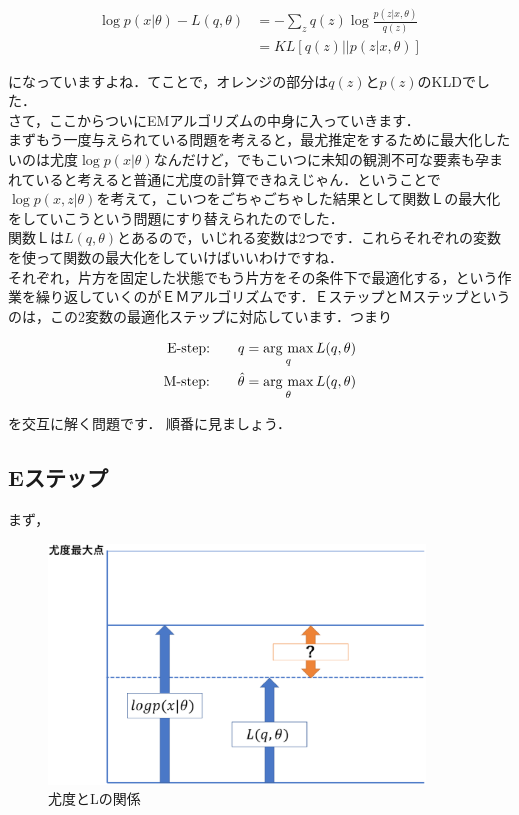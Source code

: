 \documentclass[11pt,a4paper]{ujreport}
\newcommand{\argmax}{\mathop{\rm arg~max}\limits}
\begin{document}
\begin{align}
  \log p(x|\theta) - L(q,\theta)&= -\sum_z q(z) \log \frac{p(z|x,\theta)}{q(z)}\nonumber\\
  &= KL[q(z)||p(z|x,\theta)]\nonumber
\end{align}

になっていますよね．てことで，オレンジの部分は$q(z)$と$p(z)$のKLDでした．\\

さて，ここからついにEMアルゴリズムの中身に入っていきます．\\

まずもう一度与えられている問題を考えると，最尤推定をするために最大化したいのは尤度$\log p(x|\theta)$なんだけど，でもこいつに未知の観測不可な要素も孕まれていると考えると普通に尤度の計算できねえじゃん．ということで$\log p(x,z|\theta)$を考えて，こいつをごちゃごちゃした結果として関数Ｌの最大化をしていこうという問題にすり替えられたのでした．\\

関数Ｌは$L(q,\theta)$とあるので，いじれる変数は2つです．これらそれぞれの変数を使って関数の最大化をしていけばいいわけですね．\\

それぞれ，片方を固定した状態でもう片方をその条件下で最適化する，という作業を繰り返していくのがＥＭアルゴリズムです．ＥステップとＭステップというのは，この2変数の最適化ステップに対応しています．つまり

\begin{align}
  \text{E-step:} \qquad q &= \argmax_{q}L(q,\theta)\nonumber\\
  \text{M-step:} \qquad \hat{\theta} &= \argmax_{\theta}L(q,\theta)\nonumber
\end{align}

を交互に解く問題です．
順番に見ましょう．\\

\subsection{Eステップ}

まず，
\begin{figure}[H]
  \centering
  \includegraphics[width=10cm]{../figures/em1.eps}
  \caption{尤度とLの関係}
\end{figure}
\end{document}
